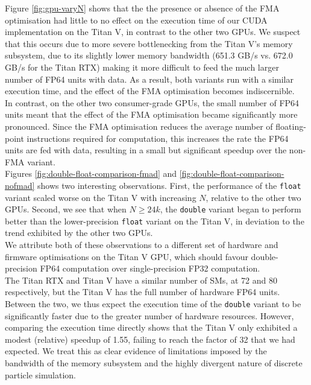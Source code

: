 \documentclass[12pt]{article}
\begin{document}
Figure \ref{fig:gpu-varyN} shows that the the presence or absence of the FMA optimisation had little to no effect on the execution time of our CUDA implementation on the Titan V, in contrast to the other two GPUs. We suspect that this occurs due to more severe bottlenecking from the Titan V's memory subsystem, due to its slightly lower memory bandwidth (651.3 GB/s vs. 672.0 GB/s for the Titan RTX) making it more difficult to feed the much larger number of FP64 units with data. As a result, both variants run with a similar execution time, and the effect of the FMA optimisation becomes indiscernible.\\

In contrast, on the other two consumer-grade GPUs, the small number of FP64 units meant that the effect of the FMA optimisation became significantly more pronounced. Since the FMA optimisation reduces the average number of floating-point instructions required for computation, this increases the rate the FP64 units are fed with data, resulting in a small but significant speedup over the non-FMA variant.\\

Figures \ref{fig:double-float-comparison-fmad} and \ref{fig:double-float-comparison-nofmad} shows two interesting observations. First, the performance of the \texttt{float} variant scaled worse on the Titan V with increasing $N$, relative to the other two GPUs. Second, we see that when $N \geq 24k$, the \texttt{double} variant began to perform better than the lower-precision \texttt{float} variant on the Titan V, in deviation to the trend exhibited by the other two GPUs.\\

We attribute both of these observations to a different set of hardware and firmware optimisations on the Titan V GPU, which should favour double-precision FP64 computation over single-precision FP32 computation.\\ 

The Titan RTX and Titan V have a similar number of SMs, at 72 and 80 respectively, but the Titan V has the full number of hardware FP64 units. Between the two, we thus expect the execution time of the \texttt{double} variant to be significantly faster due to the greater number of hardware resources. However, comparing the execution time directly shows that the Titan V only exhibited a modest (relative) speedup of 1.55, failing to reach the factor of 32 that we had expected. We treat this as clear evidence of limitations imposed by the bandwidth of the memory subsystem and the highly divergent nature of discrete particle simulation.
\end{document}
